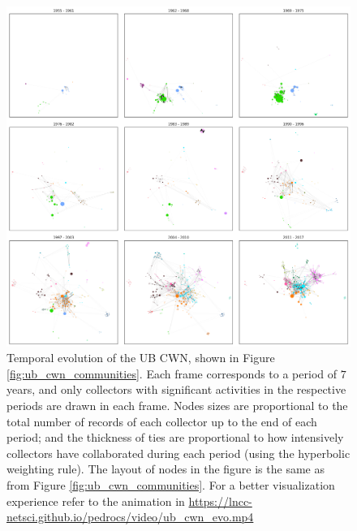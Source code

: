 \begin{figure}[h!]
  	\centering
    \includegraphics[width=\linewidth]{figures/casestudy_ub/cwn_temporal_evol.png}
    \caption[Temporal evolution of the UB CWN]{ Temporal evolution of the UB CWN, shown in Figure \ref{fig:ub_cwn_communities}. Each frame corresponds to a period of $7$ years, and only collectors with significant activities in the respective periods are drawn in each frame. Nodes sizes are proportional to the total number of records of each collector up to the end of each period; and the thickness of ties are proportional to how intensively collectors have collaborated during each period (using the hyperbolic weighting rule). The layout of nodes in the figure is the same as from Figure \ref{fig:ub_cwn_communities}. For a better visualization experience refer to the animation in \url{https://lncc-netsci.github.io/pedrocs/video/ub_cwn_evo.mp4}}
    \label{fig:ub_cwn_temporal_evol}
\end{figure}

